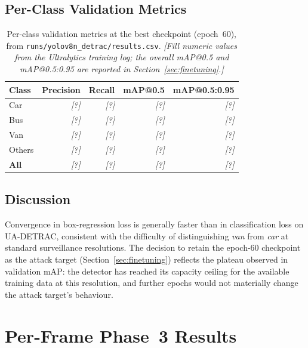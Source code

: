 \documentclass[12pt,a4paper]{report}
\begin{document}
\section{Per-Class Validation Metrics}

\begin{table}[htbp]
  \centering
  \caption{Per-class validation metrics at the best checkpoint
           (epoch~60), from \texttt{runs/yolov8n\_detrac/results.csv}.
           \textit{[Fill numeric values from the Ultralytics training log;
           the overall mAP@0.5 and mAP@0.5:0.95 are reported in
           Section~\ref{sec:finetuning}.]}}
  \label{tab:detector_val}
  \small
  \begin{tabular}{@{}lrrrr@{}}
    \toprule
    Class & Precision & Recall & mAP@0.5 & mAP@0.5:0.95 \\
    \midrule
    Car    & \textit{[?]} & \textit{[?]} & \textit{[?]} & \textit{[?]} \\
    Bus    & \textit{[?]} & \textit{[?]} & \textit{[?]} & \textit{[?]} \\
    Van    & \textit{[?]} & \textit{[?]} & \textit{[?]} & \textit{[?]} \\
    Others & \textit{[?]} & \textit{[?]} & \textit{[?]} & \textit{[?]} \\
    \midrule
    \textbf{All} & \textit{[?]} & \textit{[?]} & \textit{[?]} & \textit{[?]} \\
    \bottomrule
  \end{tabular}
\end{table}

\section{Discussion}

Convergence in box-regression loss is generally faster than in
classification loss on UA-DETRAC, consistent with the difficulty of
distinguishing \emph{van} from \emph{car} at standard surveillance
resolutions.  The decision to retain the epoch-60 checkpoint as the
attack target (Section~\ref{sec:finetuning}) reflects the plateau
observed in validation mAP: the detector has reached its capacity
ceiling for the available training data at this resolution, and further
epochs would not materially change the attack target's behaviour.


\chapter{Per-Frame Phase~3 Results}
\label{app:per_frame}
\end{document}
